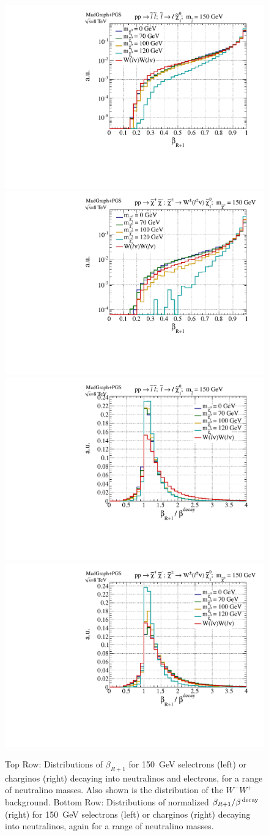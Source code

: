 \begin{figure}[ht]
\includegraphics[width=0.4\columnwidth]{fig/sectionII/betaRp1_1D_slepton.pdf}
\includegraphics[width=0.4\columnwidth]{fig/sectionII/betaRp1_1D_chargino.pdf}
\includegraphics[width=0.4\columnwidth]{fig/sectionII/betaRp1_norm_1D_slepton.pdf}
\includegraphics[width=0.4\columnwidth]{fig/sectionII/betaRp1_norm_1D_chargino.pdf}
\caption{Top Row: Distributions of $\beta_{R+1}$ for 150~GeV selectrons (left) or charginos (right) decaying into neutralinos and electrons, for a range of neutralino masses. Also shown is the distribution of the $W^-W^+$ background. Bottom Row: Distributions of normalized $\beta_{R+1}/\beta^{\, \rm decay}$ (right) for 150~GeV selectrons (left) or charginos (right) decaying into neutralinos, again for a range of neutralino masses. \label{fig:betap1}}
\end{figure}

